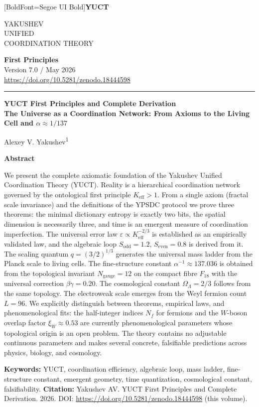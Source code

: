 \documentclass[12pt,a4paper]{article}
\newcommand{\makeheader}{%
	\noindent
	\begin{minipage}{0.17\textwidth}
		\raggedright
		{\fontspec{Segoe UI}[BoldFont=Segoe UI Bold]\bfseries\color{skyblue}\fontsize{46}{46}\selectfont YUCT}%
	\end{minipage}%
	\hspace{30pt}
	\begin{minipage}{0.32\textwidth}
		\raggedright
		{\sffamily\fontsize{11}{13}\selectfont YAKUSHEV\\ UNIFIED\\ COORDINATION THEORY}%
	\end{minipage}%
	\hfill
	\begin{minipage}{0.38\textwidth}
		\raggedleft
		{\sffamily\bfseries First Principles}\\ 
		{\sffamily Version 7.0 / May 2026}\\ 
		{\sffamily\footnotesize \scriptsize \url{https://doi.org/10.5281/zenodo.18444598}}%
	\end{minipage}
	\par\vspace{5pt}
	\noindent\textcolor{gold}{\rule{\textwidth}{1.6pt}}
	\par\vspace{0pt}
}
\begin{document}
	
	\thispagestyle{firstpage}
	\makeheader
	
	\vspace{0cm}
	{\LARGE\bfseries YUCT First Principles and Complete Derivation \\
		\Large The Universe as a Coordination Network: From Axioms to the Living Cell and \(\alpha \approx 1/137\) \par}
	\vspace{0.2cm}
	
	{\large Alexey V. Yakushev\textsuperscript{1}} \\
	\vspace{0.0cm}
	
	{\color{darkblue}\textbf{\LARGE Abstract}} \par
	{\large
		\noindent
		We present the complete axiomatic foundation of the Yakushev Unified Coordination Theory (YUCT). Reality is a hierarchical coordination network governed by the ontological first principle \(K_{\mathrm{eff}} > 1\). From a single axiom (fractal scale invariance) and the definitions of the YPSDC protocol we prove three theorems: the minimal dictionary entropy is exactly two bits, the spatial dimension is necessarily three, and time is an emergent measure of coordination imperfection. The universal error law \(\varepsilon \propto K_{\mathrm{eff}}^{-2/3}\) is established as an empirically validated law, and the algebraic loop \(S_{\mathrm{odd}} = 1.2\), \(S_{\mathrm{even}} = 0.8\) is derived from it. The scaling quantum \(q = (3/2)^{1/3}\) generates the universal mass ladder from the Planck scale to living cells. The fine-structure constant \(\alpha^{-1} \approx 137.036\) is obtained from the topological invariant \(N_{\mathrm{gauge}} = 12\) on the compact fibre \(F_{18}\) with the universal correction \(\beta\gamma = 0.20\). The cosmological constant \(\Omega_\Lambda = 2/3\) follows from the same topology. The electroweak scale emerges from the Weyl fermion count \(L = 96\). We explicitly distinguish between theorems, empirical laws, and phenomenological fits: the half-integer indices \(N_f\) for fermions and the \(W\)-boson overlap factor \(\xi_W \approx 0.53\) are currently phenomenological parameters whose topological origin is an open problem. The theory contains no adjustable continuous parameters and makes several concrete, falsifiable predictions across physics, biology, and cosmology.
	}
	
	\vspace{0.1cm}
	\noindent
	{\color{darkblue}\textbf{Keywords:}} YUCT, coordination efficiency, algebraic loop, mass ladder, fine-structure constant, emergent geometry, time quantization, cosmological constant, falsifiability.
	\vspace{0.1cm}
	\noindent
	{\color{darkblue}\textbf{Citation:}} Yakushev AV. YUCT First Principles and Complete Derivation. 2026. DOI: \url{https://doi.org/10.5281/zenodo.18444598} (this volume).
	
\end{document}
